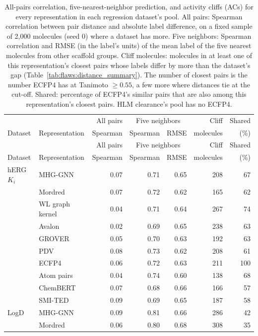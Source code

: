 {\footnotesize\setlength{\tabcolsep}{3pt}
\begin{longtable}{llrrrrr}
\caption{All-pairs correlation, five-nearest-neighbor prediction, and activity cliffs (ACs) for every representation in each regression dataset's pool. All pairs: Spearman correlation between pair distance and absolute label difference, on a fixed sample of 2,000 molecules (seed 0) where a dataset has more. Five neighbors: Spearman correlation and RMSE (in the label's units) of the mean label of the five nearest molecules from other scaffold groups. Cliff molecules: molecules in at least one of this representation's closest pairs whose labels differ by more than the dataset's gap (Table~\ref{tab:flaws:distance_summary}). The number of closest pairs is the number ECFP4 has at Tanimoto $\geq 0.55$, a few more where distances tie at the cut-off. Shared: percentage of ECFP4's similar pairs that are also among this representation's closest pairs. HLM clearance's pool has no ECFP4.}\label{tab:flaws:distance_per_rep}\\
\toprule
 & & All pairs & \multicolumn{2}{c}{Five neighbors} & Cliff & Shared \\
Dataset & Representation & Spearman & Spearman & RMSE & molecules & (\%) \\
\midrule
\endfirsthead
\toprule
& & All pairs & \multicolumn{2}{c}{Five neighbors} & Cliff & Shared \\
Dataset & Representation & Spearman & Spearman & RMSE & molecules & (\%) \\
\midrule
\endhead
\bottomrule
\endfoot
hERG $K_i$ & MHG-GNN & 0.07 & 0.71 & 0.65 & 208 & 67 \\
 & Mordred & 0.07 & 0.72 & 0.62 & 165 & 62 \\
 & WL graph kernel & 0.04 & 0.71 & 0.64 & 267 & 74 \\
 & Avalon & 0.02 & 0.69 & 0.65 & 238 & 63 \\
 & GROVER & 0.05 & 0.70 & 0.63 & 192 & 63 \\
 & PDV & 0.08 & 0.73 & 0.62 & 208 & 61 \\
 & ECFP4 & 0.06 & 0.72 & 0.63 & 211 & 100 \\
 & Atom pairs & 0.04 & 0.74 & 0.60 & 138 & 68 \\
 & ChemBERT & 0.07 & 0.68 & 0.66 & 166 & 57 \\
 & SMI-TED & 0.09 & 0.69 & 0.65 & 187 & 58 \\
\midrule
LogD & MHG-GNN & 0.09 & 0.81 & 0.66 & 286 & 42 \\
 & Mordred & 0.06 & 0.80 & 0.68 & 308 & 35 \\

\end{longtable}}
